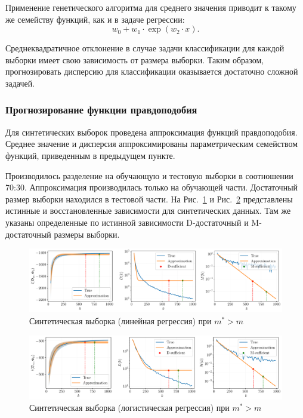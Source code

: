Применение генетического алгоритма для среднего значения приводит к такому же семейству функций, как и в задаче регрессии:
\[ w_0 + w_1 \cdot \exp(w_2 \cdot x). \]

Среднеквадратичное отклонение в случае задачи классификации для каждой выборки имеет свою зависимость от размера выборки. Таким образом, прогнозировать дисперсию для классификации оказывается достаточно сложной задачей.

\subsubsection{Прогнозирование функции правдоподобия}

Для синтетических выборок проведена аппроксимация функций правдоподобия. Среднее значение и дисперсия аппроксимированы параметрическим семейством функций, приведенным в предыдущем пункте.

Производилось разделение на обучающую и тестовую выборки в соотношении 70:30. Аппроксимация производилась только на обучающей части. Достаточный размер выборки находился в тестовой части. На Рис.~\ref{synthetic-regression-approximation} и Рис.~\ref{synthetic-classification-approximation} представлены истинные и восстановленные зависимости для синтетических данных. Там же указаны определенные по истинной зависимости D-достаточный и M-достаточный размеры выборки. 

\begin{figure}[h!]
    \centering
    \includegraphics[width=\textwidth]{figures/synthetic-regression-approximation.pdf}
    \caption{Синтетическая выборка (линейная регрессия) при $m^* > m$}
    \label{synthetic-regression-approximation}
\end{figure}

\begin{figure}[h!]
    \centering
    \includegraphics[width=\textwidth]{figures/synthetic-classification-approximation.pdf}
    \caption{Синтетическая выборка (логистическая регрессия) при $m^* > m$}
    \label{synthetic-classification-approximation}
\end{figure}

